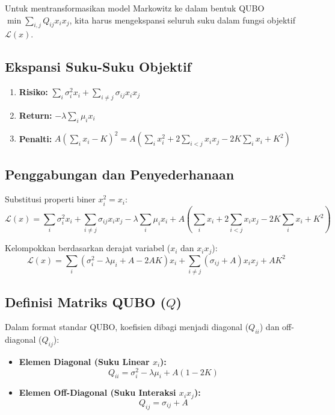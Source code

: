 \documentclass[12pt,a4paper]{article}
\providecommand{\tightlist}{%
  \setlength{\itemsep}{0pt}\setlength{\parskip}{0pt}}
\begin{document}
Untuk mentransformasikan model Markowitz ke dalam bentuk QUBO \(\min \sum_{i,j} Q_{ij} x_i x_j\), kita harus mengekspansi seluruh suku dalam fungsi objektif \(\mathcal{L}(x)\).

\hypertarget{langkah-1-ekspansi-suku-suku-objektif}{%
\subsection{Ekspansi Suku-Suku Objektif}\label{langkah-1-ekspansi-suku-suku-objektif}}

\begin{enumerate}
\def\labelenumi{\arabic{enumi}.}
\tightlist
\item
  \textbf{Risiko:} \(\sum_i \sigma_i^2 x_i + \sum_{i \neq j} \sigma_{ij} x_i x_j\)
\item
  \textbf{Return:} \(-\lambda \sum_i \mu_i x_i\)
\item
  \textbf{Penalti:} \(A \left( \sum_i x_i - K \right)^2 = A \left( \sum_i x_i^2 + 2 \sum_{i < j} x_i x_j - 2K \sum_i x_i + K^2 \right)\)
\end{enumerate}

\hypertarget{langkah-2-penggabungan-dan-penyederhanaan}{%
\subsection{Penggabungan dan Penyederhanaan}\label{langkah-2-penggabungan-dan-penyederhanaan}}

Substitusi properti biner \(x_i^2 = x_i\): \[ \mathcal{L}(x) = \sum_i \sigma_i^2 x_i + \sum_{i \neq j} \sigma_{ij} x_i x_j - \lambda \sum_i \mu_i x_i + A \left( \sum_i x_i + 2 \sum_{i < j} x_i x_j - 2K \sum_i x_i + K^2 \right) \]

Kelompokkan berdasarkan derajat variabel (\(x_i\) dan \(x_i x_j\)): \[ \mathcal{L}(x) = \sum_i (\sigma_i^2 - \lambda \mu_i + A - 2AK) x_i + \sum_{i \neq j} (\sigma_{ij} + A) x_i x_j + AK^2 \]

\hypertarget{langkah-3-definisi-matriks-qubo-q}{%
\subsection{\texorpdfstring{Definisi Matriks QUBO (\(Q\))}{Langkah 3: Definisi Matriks QUBO (Q)}}\label{langkah-3-definisi-matriks-qubo-q}}

Dalam format standar QUBO, koefisien dibagi menjadi diagonal (\(Q_{ii}\)) dan off-diagonal (\(Q_{ij}\)): 
\begin{itemize}
    \item \textbf{Elemen Diagonal (Suku Linear \(x_i\)):} \[ Q_{ii} = \sigma_i^2 - \lambda \mu_i + A(1 - 2K) \]
    \item \textbf{Elemen Off-Diagonal (Suku Interaksi \(x_i x_j\)):} \[ Q_{ij} = \sigma_{ij} + A \]
\end{itemize}
\end{document}
